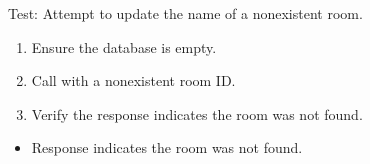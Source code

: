 \documentclass[letterpaper,10pt,english]{sphinxmanual}
\begin{document}
\begin{fulllineitems}
\label{\detokenize{test:test.test_room.test_update_room_name_room_not_found}}
\pysigstartsignatures
\pysiglinewithargsret
{}
{}
{}
\pysigstopsignatures
\sphinxAtStartPar
Test: Attempt to update the name of a non\sphinxhyphen{}existent room.
\begin{description}
\begin{enumerate}
%
\item {} 
\sphinxAtStartPar
Ensure the database is empty.

\item {} 
\sphinxAtStartPar
Call  with a non\sphinxhyphen{}existent room ID.

\item {} 
\sphinxAtStartPar
Verify the response indicates the room was not found.

\end{enumerate}

\begin{itemize}
\item {} 
\sphinxAtStartPar
Response indicates the room was not found.

\end{itemize}

\end{description}

\end{fulllineitems}

\end{document}
